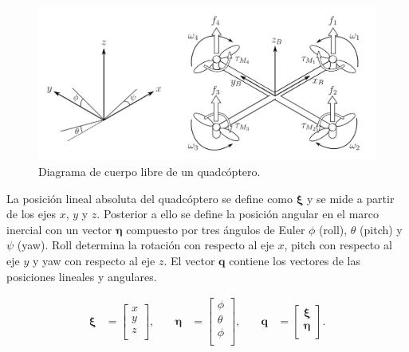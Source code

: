 \documentclass[11pt]{exam}
\begin{document}
        \begin{figure}[ht]
            \centering
            \includegraphics[width = 14cm]{pictures/drone-model.png}
            \caption{Diagrama de cuerpo libre de un quadc\'optero.}
            \label{fig:drone-model}
        \end{figure}

        La posición lineal absoluta del quadc\'optero se define como $\boldsymbol{\xi}$ y se mide a partir de los ejes $x$, $y$ y $z$. Posterior a ello se define la posici\'on angular en el marco inercial con un vector $\boldsymbol{\eta}$ compuesto por tres \'angulos de Euler $\phi$ (roll), $\theta$ (pitch) y $\psi$ (yaw). Roll determina la rotación con respecto al eje $x$, pitch con respecto al eje $y$ y yaw con respecto al eje $z$. El vector $\boldsymbol{q}$ contiene los vectores de las posiciones lineales y angulares.
    
        \begin{align}
            \boldsymbol{\xi} &= 
            \left[{
                \begin{array}{c}
                    x \\
                    y \\
                    z \\
                \end{array} 
            }\right],
            &\quad
            \boldsymbol{\eta} &= 
            \left[{
                \begin{array}{c}
                    \phi \\
                    \theta \\
                    \phi \\
                \end{array} 
            }\right],
            &\quad
            \boldsymbol{q} &=
            \left[{
                \begin{array}{c}
                    \boldsymbol{\xi} \\
                    \boldsymbol{\eta} \\
                \end{array} 
            }\right].
        \end{align}
\end{document}
